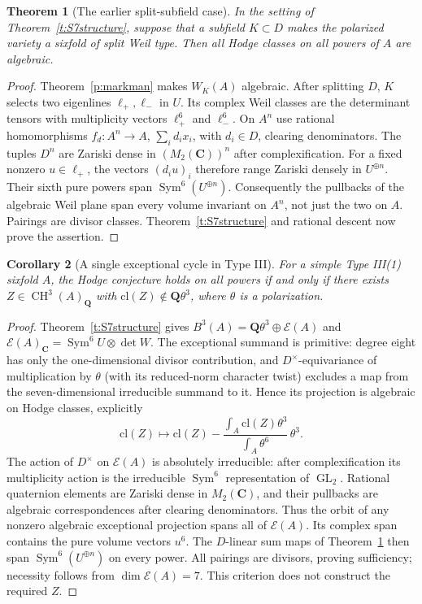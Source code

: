 \documentclass[11pt,reqno]{article}
\theoremstyle{emphasizedplain}
\newtheorem{theorem}{Theorem}[section]
\newtheorem{corollary}[theorem]{Corollary}
\theoremstyle{emphasizeddefinition}
\theoremstyle{emphasizeddefinition}
\DeclareMathOperator{\GL}{GL}
\DeclareMathOperator{\Sym}{Sym}
\DeclareMathOperator{\CH}{CH}
\newcommand{\Q}{\mathbf Q}
\newcommand{\C}{\mathbf C}
\newcommand{\B}{B}
\begin{document}
\begin{theorem}[The earlier split-subfield case]\label{t:S7split}
In the setting of Theorem~\ref{t:S7structure}, suppose that a subfield
$K\subset D$ makes the polarized variety a sixfold of split Weil type.
Then all Hodge classes on all powers of $A$ are algebraic.
\end{theorem}
\begin{proof}
Theorem~\ref{p:markman} makes $W_K(A)$ algebraic. After splitting $D$,
$K$ selects two eigenlines $\ell_+,\ell_-$ in $U$. Its complex Weil
classes are the determinant tensors with multiplicity vectors
$\ell_+^6$ and $\ell_-^6$.
On $A^n$ use rational homomorphisms
$f_d:A^n\to A$, $\sum_i d_i x_i$, with $d_i\in D$, clearing denominators.
The tuples $D^n$ are Zariski dense in $(M_2(\C))^n$ after complexification.
For a fixed nonzero $u\in\ell_+$, the vectors $(d_i u)_i$ therefore range
Zariski densely in $U^{\oplus n}$. Their sixth pure powers span
$\Sym^6(U^{\oplus n})$.
Consequently the pullbacks of the algebraic Weil plane span every volume
invariant on $A^n$, not just the two on $A$. Pairings are divisor classes.
Theorem~\ref{t:S7structure} and rational descent now prove the assertion.
\end{proof}
\begin{corollary}[A single exceptional cycle in Type III]
\label{p:S7onecycle}
For a simple Type III(1) sixfold $A$, the Hodge conjecture holds on
all powers if and only if there exists $Z\in\CH^3(A)_\Q$ with
$\mathrm{cl}(Z)\notin\Q\theta^3$, where $\theta$ is a polarization.
\end{corollary}
\begin{proof}
Theorem~\ref{t:S7structure} gives
$\B^3(A)=\Q\theta^3\oplus\mathcal E(A)$ and
$\mathcal E(A)_\C=\Sym^6 U\otimes\det W$.
The exceptional summand is primitive: degree eight has only the
one-dimensional divisor contribution, and $D^\times$-equivariance
of multiplication by $\theta$ (with its reduced-norm character twist)
excludes a map from the seven-dimensional irreducible summand to it. Hence its projection is
algebraic on Hodge classes, explicitly
\[
 \mathrm{cl}(Z)\longmapsto\mathrm{cl}(Z)
 -\frac{\int_A\mathrm{cl}(Z)\theta^3}{\int_A\theta^6}\,\theta^3.
\]
The action of $D^\times$ on $\mathcal E(A)$ is absolutely irreducible:
after complexification its multiplicity action is the irreducible
$\Sym^6$ representation of $\GL_2$. Rational quaternion elements
are Zariski dense in $M_2(\C)$, and their pullbacks are algebraic
correspondences after clearing denominators. Thus the orbit of any
nonzero algebraic exceptional projection spans all of $\mathcal E(A)$.
Its complex span contains the pure volume vectors $u^6$.
The $D$-linear sum maps of Theorem~\ref{t:S7split} then span
$\Sym^6(U^{\oplus n})$ on every power. All pairings are divisors,
proving sufficiency; necessity follows from $\dim\mathcal E(A)=7$.
This criterion does not construct the required $Z$.
\end{proof}
\end{document}
